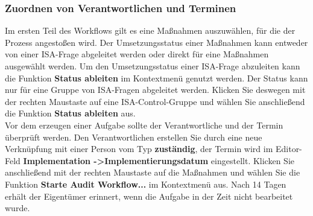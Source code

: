 \documentclass[a4paper,10pt]{book}
\begin{document}
\subsubsection{Zuordnen von Verantwortlichen und Terminen}
Im ersten Teil des Workflows gilt es eine Maßnahmen auszuwählen, für die der Prozess angestoßen wird. Der Umsetzungsstatus einer Maßnahmen
kann entweder von einer ISA-Frage abgeleitet werden oder direkt für eine Maßnahmen ausgewählt werden. Um den Umsetzungsstatus einer ISA-Frage
abzuleiten kann die Funktion \textbf{Status ableiten} im Kontextmenü genutzt werden. Der Status kann nur für eine Gruppe von ISA-Fragen abgeleitet werden.
Klicken Sie deswegen mit der rechten Maustaste auf eine ISA-Control-Gruppe und wählen Sie anschließend die Funktion \textbf{Status ableiten} aus.
\newline\\
Vor dem erzeugen einer Aufgabe sollte der Verantwortliche und der Termin überprüft werden. Den Verantwortlichen erstellen Sie durch eine
neue Verknüpfung mit einer Person vom Typ \textbf{zuständig}, der Termin wird im Editor-Feld \textbf{Implementation -\textgreater Implementierungsdatum}
eingestellt. Klicken Sie anschließend mit der rechten Maustaste auf die Maßnahmen und wählen Sie die Funktion \textbf{Starte Audit Workflow...} im Kontextmenü aus.
Nach 14 Tagen erhält der Eigentümer erinnert, wenn die Aufgabe in der Zeit nicht bearbeitet wurde.
\end{document}
